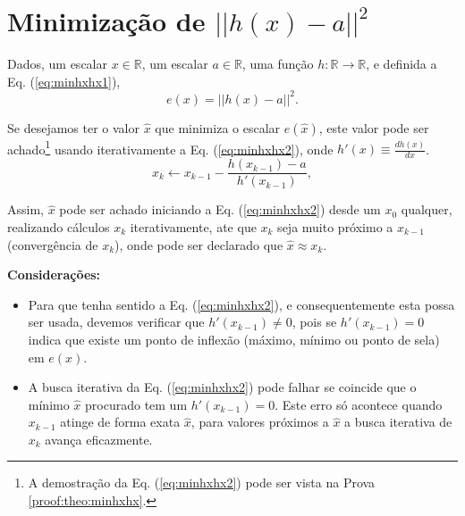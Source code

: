 \section{Minimização de $||h(x)-a||^2$} 




\begin{theorem}\label{theo:minhxhx}
Dados,
um escalar $x \in \mathbb{R}$, 
um escalar $a \in \mathbb{R}$,  
uma função $h:\mathbb{R} \rightarrow \mathbb{R}$, e 
definida a Eq. (\ref{eq:minhxhx1}),
\begin{equation}\label{eq:minhxhx1}
e(x)=||h(x)-a||^2.
\end{equation}

Se desejamos ter o valor $\hat{x}$ que minimiza o escalar $e(\hat{x})$,
este valor pode ser achado\footnote{A 
demostração da Eq. (\ref{eq:minhxhx2}) pode ser vista na Prova \ref{proof:theo:minhxhx}.} 
usando iterativamente a Eq. (\ref{eq:minhxhx2}),
onde  $h'(x)\equiv \frac{d h(x)}{d x}$.
\begin{equation}\label{eq:minhxhx2}
x_{k} \leftarrow x_{k-1}-
\frac{ h(x_{k-1})-a}{h'(x_{k-1})},
\end{equation}


Assim, $\hat{x}$ pode ser achado iniciando a Eq. (\ref{eq:minhxhx2}) desde um 
$x_{0}$ qualquer, realizando cálculos $x_{k}$ iterativamente, 
ate que $x_{k}$ seja muito próximo a $x_{k-1}$ (convergência de $x_{k}$),
onde pode ser declarado que $\hat{x} \approx x_{k}$.

\textbf{Considerações:}
\begin{itemize} 
\item Para que tenha sentido a Eq. (\ref{eq:minhxhx2}),
 e consequentemente esta possa ser usada, devemos verificar que  $h'(x_{k-1})\neq 0$,
pois se $h'(x_{k-1})= 0$ indica que existe um ponto de inflexão 
(máximo, mínimo ou ponto de sela) em $e(x)$.
\item A busca iterativa da Eq. (\ref{eq:minhxhx2}) pode falhar se coincide que o mínimo $\hat{x}$ procurado
tem um $h'(x_{k-1})= 0$.
Este erro só acontece quando $x_{k-1}$ atinge de forma exata $\hat{x}$,
para valores próximos a $\hat{x}$ a busca iterativa de $x_{k}$ avança eficazmente.
\end{itemize}
\end{theorem}



